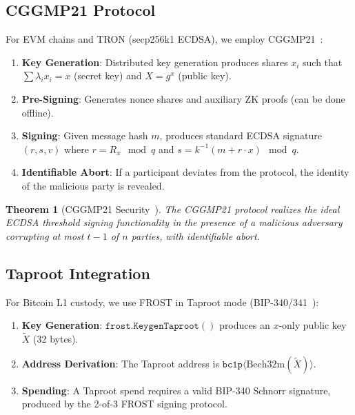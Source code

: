 \documentclass[11pt,twocolumn]{article}
\newtheorem{theorem}{Theorem}[section]
\begin{document}
\subsection{CGGMP21 Protocol}

For EVM chains and TRON (secp256k1 ECDSA), we employ CGGMP21~\cite{cggmp21}:

\begin{enumerate}[nosep]
  \item \textbf{Key Generation}: Distributed key generation produces shares $x_i$ such that $\sum \lambda_i x_i = x$ (secret key) and $X = g^x$ (public key).
  \item \textbf{Pre-Signing}: Generates nonce shares and auxiliary ZK proofs (can be done offline).
  \item \textbf{Signing}: Given message hash $m$, produces standard ECDSA signature $(r, s, v)$ where $r = R_x \mod q$ and $s = k^{-1}(m + r \cdot x) \mod q$.
  \item \textbf{Identifiable Abort}: If a participant deviates from the protocol, the identity of the malicious party is revealed.
\end{enumerate}

\begin{theorem}[CGGMP21 Security~\cite{cggmp21}]
The CGGMP21 protocol realizes the ideal ECDSA threshold signing functionality in the presence of a malicious adversary corrupting at most $t - 1$ of $n$ parties, with identifiable abort.
\end{theorem}

\subsection{Taproot Integration}

For Bitcoin L1 custody, we use FROST in Taproot mode (BIP-340/341~\cite{bip340,bip341}):

\begin{enumerate}[nosep]
  \item \textbf{Key Generation}: $\texttt{frost.KeygenTaproot}()$ produces an $x$-only public key $\tilde{X}$ (32 bytes).
  \item \textbf{Address Derivation}: The Taproot address is $\texttt{bc1p}\langle\text{Bech32m}(\tilde{X})\rangle$.
  \item \textbf{Spending}: A Taproot spend requires a valid BIP-340 Schnorr signature, produced by the 2-of-3 FROST signing protocol.
\end{enumerate}
\end{document}
